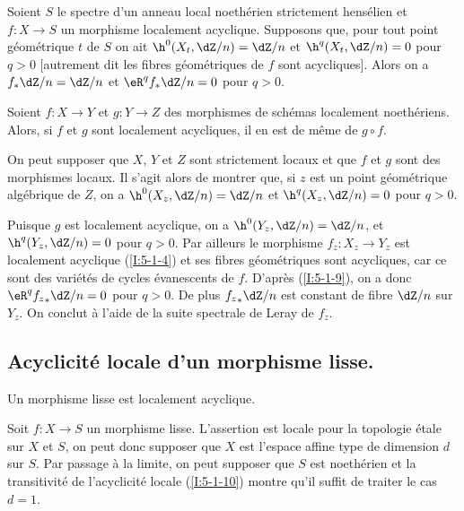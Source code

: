 \begin{corollarydotdash}\label{I:5-1-9}
Soient $S$ le spectre d'un anneau local noethérien strictement hensélien et 
$f:X\to S$ un morphisme localement acyclique. Supposons que, pour tout point 
géométrique $t$ de $S$ on ait $\h^0(X_t,\dZ/n) = \dZ/n$ et 
$\h^q(X_t,\dZ/n) = 0$ pour $q>0$ [autrement dit les fibres géométriques de 
$f$ sont acycliques]. Alors on a $f_* \dZ/n = \dZ/n$ et $\eR^qf_*\dZ/n = 0$ pour 
$q>0$. 
\end{corollarydotdash}





\begin{corollarydotdash}\label{I:5-1-10}
Soient $f:X\to Y$ et $g:Y\to Z$ des morphismes de schémas localement 
noethériens. Alors, si $f$ et $g$ sont localement acycliques, il en est de 
même de $g\circ f$. 
\end{corollarydotdash}

On peut supposer que $X$, $Y$ et $Z$ sont strictement locaux et que $f$ et $g$ 
sont des morphismes locaux. Il s'agit alors de montrer que, si $z$ est un point 
géométrique algébrique de $Z$, on a $\h^0(X_z,\dZ/n) = \dZ/n$ et 
$\h^q(X_z,\dZ/n) = 0$ pour $q>0$. 

Puisque $g$ est localement acyclique, on a $\h^0(Y_z,\dZ/n) = \dZ/n$, et 
$\h^q(Y_z,\dZ/n) = 0$ pour $q>0$. Par ailleurs le morphisme $f_z:X_z\to Y_z$ est 
localement acyclique (\ref{I:5-1-4}) et ses fibres géométriques sont 
acycliques, car ce sont des variétés de cycles évanescents de $f$. 
D'après (\ref{I:5-1-9}), on a donc $\eR^q {f_z}_*\dZ/n = 0$ pour $q>0$. De plus 
${f_z}_*\dZ/n$ est constant de fibre $\dZ/n$ sur $Y_z$. On conclut à l'aide de 
la suite spectrale de Leray de $f_z$. 










\subsection{Acyclicité locale d'un morphisme lisse.}\label{I:5-2}





\begin{theoremdotdash}\label{I:5-2-1}
Un morphisme lisse est localement acyclique.
\end{theoremdotdash}

Soit $f:X\to S$ un morphisme lisse. L'assertion est locale pour la topologie 
étale sur $X$ et $S$, on peut donc supposer que $X$ est l'espace affine type 
de dimension $d$ sur $S$. Par passage à la limite, on peut supposer que $S$ 
est noethérien et la transitivité de l'acyclicité locale (\ref{I:5-1-10}) montre 
qu'il suffit de traiter le cas $d=1$. 


